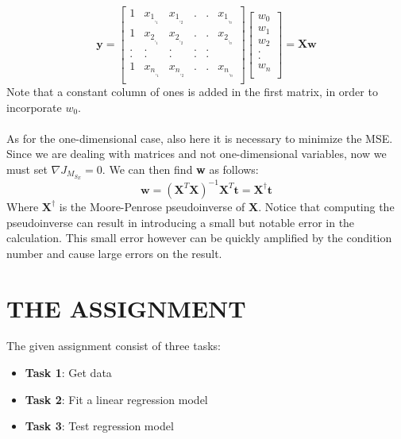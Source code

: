 \documentclass[10pt]{article}
\begin{document}
\begin{equation}
    \textbf{y} =
        \begin{bmatrix}
            1&x_1_,_1 & x_1_,_2 &.&.&x_1_,_n\\
            1&x_2_,_1 & x_2_,_2 &.&.&x_2_,_n\\
            .&.&.&.&.\\
            .&.&.&.&.\\
            1&x_n_,_1 & x_n_,_2 &.&.&x_n_,_n\\
        \end{bmatrix}
        \begin{bmatrix}
            w_0\\
            w_1\\
            w_2\\
            .\\
            .\\
            w_n\\
        \end{bmatrix} = \textbf{X}\textbf{w}
\end{equation}
Note that a constant column of ones is added in the first matrix,
in order to incorporate $w_0$.\\\\
As for the one-dimensional case, also here it is necessary to minimize the MSE. Since we are dealing with matrices and not one-dimensional variables, now we must set $\nabla J_M_S_E = 0$. We can then find \textbf{w} as follows:
\begin{equation}
\textbf{w}=\left(\textbf{X}^T\textbf{X}\right)^{-1} \textbf{X}^T\textbf{t} = \textbf{X}^{\dagger}\textbf{t}
\end{equation}
Where $\textbf{X}^{\dagger}$
is the Moore-Penrose pseudoinverse of \textbf{X}. Notice
that computing the pseudoinverse can result in introducing a
small but notable error in the calculation. This small error
however can be quickly amplified by the condition number
and cause large errors on the result.

\section{THE ASSIGNMENT}
The given assignment consist of three tasks:
\begin{itemize}
 \item \textbf{Task 1}: Get data
 \item \textbf{Task 2}: Fit a linear regression model
 \item \textbf{Task 3}: Test regression model
 \end{itemize} 
\end{document}
